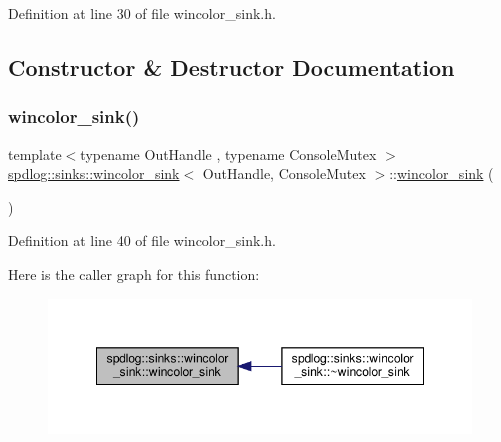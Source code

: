 Definition at line 30 of file wincolor\+\_\+sink.\+h.



\subsection{Constructor \& Destructor Documentation}
\mbox{\label{classspdlog_1_1sinks_1_1wincolor__sink_a4ed05c6780bc65806080c88202d80577}} 
\subsubsection{\texorpdfstring{wincolor\+\_\+sink()}{wincolor\_sink()}\hspace{0.1cm}{\footnotesize\ttfamily [1/2]}}
{\footnotesize\ttfamily template$<$typename Out\+Handle , typename Console\+Mutex $>$ \\
\hyperlink{classspdlog_1_1sinks_1_1wincolor__sink}{spdlog\+::sinks\+::wincolor\+\_\+sink}$<$ Out\+Handle, Console\+Mutex $>$\+::\hyperlink{classspdlog_1_1sinks_1_1wincolor__sink}{wincolor\+\_\+sink} (\begin{DoxyParamCaption}{ }\end{DoxyParamCaption})\hspace{0.3cm}{\ttfamily [inline]}}



Definition at line 40 of file wincolor\+\_\+sink.\+h.

Here is the caller graph for this function\+:
\nopagebreak
\begin{figure}[H]
\begin{center}
\leavevmode
\includegraphics[width=348pt]{classspdlog_1_1sinks_1_1wincolor__sink_a4ed05c6780bc65806080c88202d80577_icgraph}
\end{center}
\end{figure}
\mbox{\label{classspdlog_1_1sinks_1_1wincolor__sink_a229d666b7880d587aefa8c5d999acfb4}} 
